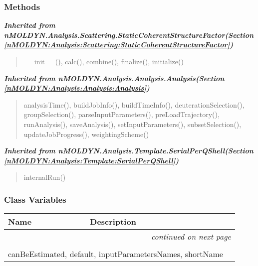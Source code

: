 
  \subsubsection{Methods}


\large{\textbf{\textit{Inherited from nMOLDYN.Analysis.Scattering.StaticCoherentStructureFactor\textit{(Section \ref{nMOLDYN:Analysis:Scattering:StaticCoherentStructureFactor})}}}}

\begin{quote}
\_\_init\_\_(), calc(), combine(), finalize(), initialize()
\end{quote}

\large{\textbf{\textit{Inherited from nMOLDYN.Analysis.Analysis.Analysis\textit{(Section \ref{nMOLDYN:Analysis:Analysis:Analysis})}}}}

\begin{quote}
analysisTime(), buildJobInfo(), buildTimeInfo(), deuterationSelection(), groupSelection(), parseInputParameters(), preLoadTrajectory(), runAnalysis(), saveAnalysis(), setInputParameters(), subsetSelection(), updateJobProgress(), weightingScheme()
\end{quote}

\large{\textbf{\textit{Inherited from nMOLDYN.Analysis.Template.SerialPerQShell\textit{(Section \ref{nMOLDYN:Analysis:Template:SerialPerQShell})}}}}

\begin{quote}
internalRun()
\end{quote}


  \subsubsection{Class Variables}

    \vspace{-1cm}
\hspace{\varindent}\begin{longtable}{|p{\varnamewidth}|p{\vardescrwidth}|l}
\cline{1-2}
\cline{1-2} \centering \textbf{Name} & \centering \textbf{Description}& \\
\cline{1-2}
\endhead\cline{1-2}\multicolumn{3}{r}{\small\textit{continued on next page}}\\\endfoot\cline{1-2}
\endlastfoot\multicolumn{2}{|l|}{\textit{Inherited from nMOLDYN.Analysis.Scattering.StaticCoherentStructureFactor \textit{(Section \ref{nMOLDYN:Analysis:Scattering:StaticCoherentStructureFactor})}}}\\
\multicolumn{2}{|p{\varwidth}|}{\raggedright canBeEstimated, default, inputParametersNames, shortName}\\
\cline{1-2}
\end{longtable}

